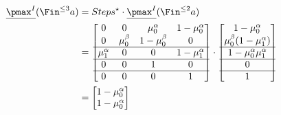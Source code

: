 \begin{align*}
	\underline{\pmax^I}(\Fin^{\le 3} a) & = Steps^\star \cdot \underline{\pmax^I}(\Fin^{\le 2} a)       \\
	                                    & = \begin{bmatrix}
		                                        0            & 0           & \mu_0^\alpha  & 1-\mu_0^\alpha \\
		                                        0            & \mu_0^\beta & 1-\mu_0^\beta & 0              \\
		                                        \hline
		                                        \mu_1^\alpha & 0           & 0             & 1-\mu_1^\alpha \\
		                                        \hline
		                                        0            & 0           & 1             & 0              \\
		                                        \hline
		                                        0            & 0           & 0             & 1              \\
	                                        \end{bmatrix} \cdot \begin{bmatrix}
		                                                            1 - \mu_0^\alpha              \\
		                                                            \mu_0^\beta(1 - \mu_1^\alpha) \\
		                                                            \hline
		                                                            1 - \mu_0^\alpha \mu_1^\alpha \\
		                                                            \hline
		                                                            0                             \\
		                                                            \hline
		                                                            1
	                                                            \end{bmatrix} \\
	                                    & = \begin{bmatrix}
		                                        1 - \mu_0^\alpha                                         \\
		                                        1 - \mu_0^\alpha                                         \\

\end{bmatrix}
\end{align*}
